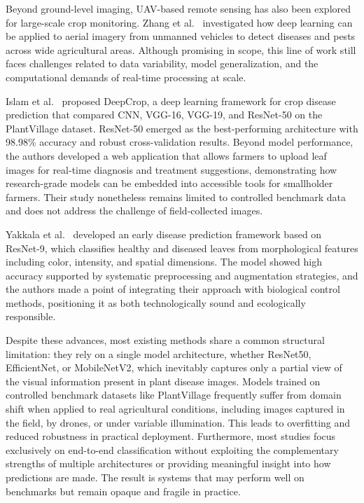 \documentclass[pdflatex,sn-basic]{sn-jnl}
\begin{document}
Beyond ground-level imaging, UAV-based remote sensing has also been explored for large-scale crop monitoring. Zhang et al.~\cite{Zhang2024} investigated how deep learning can be applied to aerial imagery from unmanned vehicles to detect diseases and pests across wide agricultural areas. Although promising in scope, this line of work still faces challenges related to data variability, model generalization, and the computational demands of real-time processing at scale.

Islam et al.~\cite{Islam2023} proposed DeepCrop, a deep learning framework for crop disease prediction that compared CNN, VGG-16, VGG-19, and ResNet-50 on the PlantVillage dataset. ResNet-50 emerged as the best-performing architecture with 98.98\% accuracy and robust cross-validation results. Beyond model performance, the authors developed a web application that allows farmers to upload leaf images for real-time diagnosis and treatment suggestions, demonstrating how research-grade models can be embedded into accessible tools for smallholder farmers. Their study nonetheless remains limited to controlled benchmark data and does not address the challenge of field-collected images.

Yakkala et al.~\cite{Yakkala2024} developed an early disease prediction framework based on ResNet-9, which classifies healthy and diseased leaves from morphological features including color, intensity, and spatial dimensions. The model showed high accuracy supported by systematic preprocessing and augmentation strategies, and the authors made a point of integrating their approach with biological control methods, positioning it as both technologically sound and ecologically responsible.

Despite these advances, most existing methods share a common structural limitation: they rely on a single model architecture, whether ResNet50, EfficientNet, or MobileNetV2, which inevitably captures only a partial view of the visual information present in plant disease images. Models trained on controlled benchmark datasets like PlantVillage frequently suffer from domain shift when applied to real agricultural conditions, including images captured in the field, by drones, or under variable illumination. This leads to overfitting and reduced robustness in practical deployment. Furthermore, most studies focus exclusively on end-to-end classification without exploiting the complementary strengths of multiple architectures or providing meaningful insight into how predictions are made. The result is systems that may perform well on benchmarks but remain opaque and fragile in practice.
\end{document}
